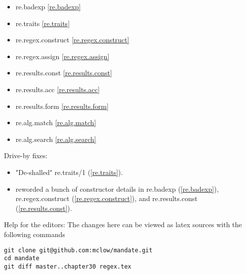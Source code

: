 \begin{itemize}
\item{re.badexp}			\ref{re.badexp}
\item{re.traits}			\ref{re.traits}
\item{re.regex.construct}	\ref{re.regex.construct}
\item{re.regex.assign}		\ref{re.regex.assign}
\item{re.results.const}		\ref{re.results.const}
\item{re.results.acc}		\ref{re.results.acc}
\item{re.results.form}		\ref{re.results.form}
\item{re.alg.match}			\ref{re.alg.match}
\item{re.alg.search}		\ref{re.alg.search}
\end{itemize}

Drive-by fixes:
\begin{itemize}
\item{"De-shalled" re.traits/1 (\ref{re.traits}).}
\item{reworded a bunch of constructor details in re.badexp (\ref{re.badexp}),  re.regex.construct (\ref{re.regex.construct}), and re.results.const (\ref{re.results.const}).}
\end{itemize}




\vfill
Help for the editors: The changes here can be viewed as latex sources with the following commands
\begin{verbatim}
git clone git@github.com:mclow/mandate.git
cd mandate
git diff master..chapter30 regex.tex
\end{verbatim}
